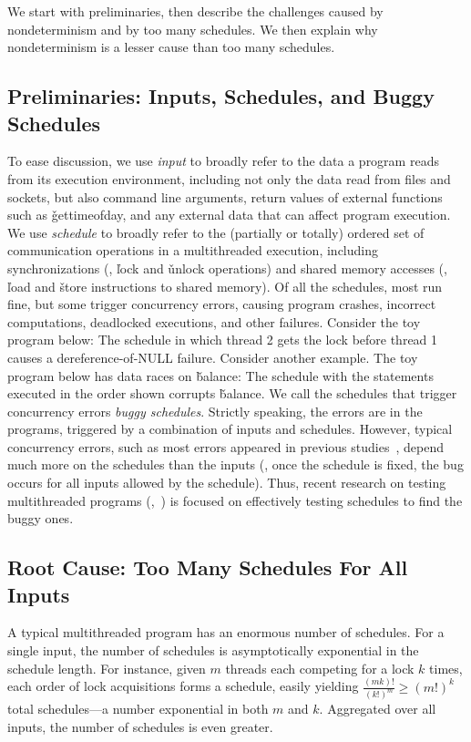 We start with preliminaries, then describe the challenges caused by
nondeterminism and by too many schedules.  We then explain why
nondeterminism is a lesser cause than too many schedules.

\subsection{Preliminaries: Inputs, Schedules, and Buggy Schedules}

To ease discussion, we use \emph{input} to broadly refer to the data a
program reads from its execution environment, including not only the data
read from files and sockets, but also command line arguments, return
values of external functions such as \v{gettimeofday}, and any external data
that can affect program execution.  We use \emph{schedule} to broadly refer to
the (partially or totally) ordered set of communication operations in a
multithreaded execution, including synchronizations (\eg, \v{lock} and
\v{unlock} operations) and shared memory accesses (\eg, \v{load} and
\v{store} instructions to shared memory). Of all the schedules, most run
fine, but some trigger concurrency errors, causing program crashes,
incorrect computations, deadlocked executions, and other failures.
Consider the toy program below: 
\noindent The schedule in which thread 2 gets the lock before thread 1
causes a dereference-of-NULL failure.  Consider another example.  The toy
program below has data races on \v{balance}: 
\noindent The schedule with the statements executed in the order shown corrupts
\v{balance}. We call the schedules that trigger concurrency errors
\emph{buggy schedules}.  Strictly speaking, the errors are in the
programs, triggered by a combination of inputs and schedules.  However,
typical concurrency errors, such as most errors appeared in previous
studies~\cite{lu:concurrency-bugs,con:hotpar12}, depend much more on the
schedules than the inputs (\eg, once the schedule is fixed, the bug
occurs for all inputs allowed by the schedule).  Thus, recent research on
testing multithreaded programs (\eg,~\cite{musuvathi:chess:osdi08}) is
focused on effectively testing schedules to find the buggy ones.

\subsection{Root Cause: Too Many Schedules For All Inputs}

A typical multithreaded program has an enormous number of schedules.  For
a single input, the number of schedules is asymptotically exponential in
the schedule length.  For instance, given $m$ threads each competing for a
lock $k$ times, each order of lock acquisitions forms a schedule, easily
yielding $\frac{(mk)!}{(k!)^m} \ge (m!)^k$ total schedules---a number
exponential in both $m$ and $k$. Aggregated over all inputs, the number of
schedules is even greater.

